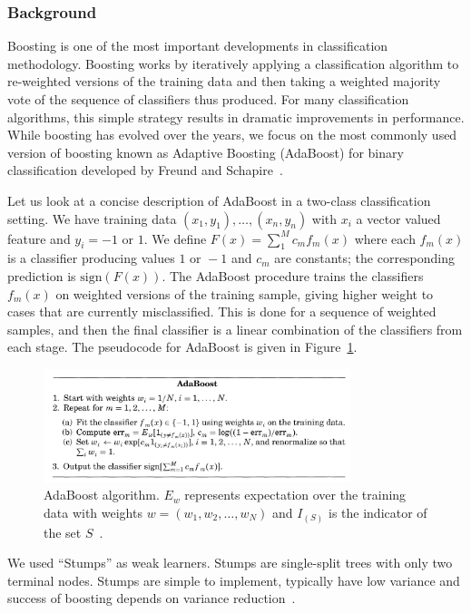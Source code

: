 \subsubsection{Background}
Boosting is one of the most important developments in classification methodology. Boosting works by iteratively applying a classification algorithm to re-weighted versions of the training data and then taking a weighted majority vote of the sequence of classifiers thus produced. For many classification algorithms, this simple strategy results in dramatic improvements in performance. While boosting has evolved over the years, we focus on the most commonly used version of boosting known as Adaptive Boosting (AdaBoost) for binary classification developed by Freund and Schapire~\cite{boost96}.

Let us look at a concise description of AdaBoost in a two-class classification setting. We have training data $(x_1, y_1), \ldots, (x_n, y_n)$ with $x_i$ a vector valued feature and $y_i = -1\text{ or }1$. We define $F(x) = \sum_1^M{c_mf_m(x)}$ where each $f_m(x)$ is a classifier producing values $1\text{ or }-1$ and $c_m$ are constants; the corresponding prediction is $\text{sign}(F(x))$. The AdaBoost procedure trains the classifiers $f_m(x)$ on weighted versions of the training sample, giving higher weight to cases that are currently misclassified. This is done for a sequence of weighted samples, and then the final classifier is a linear combination of the classifiers from each stage. The pseudocode for AdaBoost is given in Figure~\ref{fig:adaproc}.

\begin{figure}[ht]
\centering
\includegraphics[width=0.8\textwidth]{ada.png}
\caption{AdaBoost algorithm. $E_w$ represents expectation over the training data with weights $w=(w_1,w_2,\ldots,w_N)$ and $I_{(S)}$ is the indicator of the set $S$~\cite{alr00}.}
\label{fig:adaproc}
\end{figure}

We used ``Stumps'' as weak learners. Stumps are single-split trees with only two terminal nodes. Stumps are simple to implement, typically have low variance and success of boosting depends on variance reduction~\cite{alr00}.


